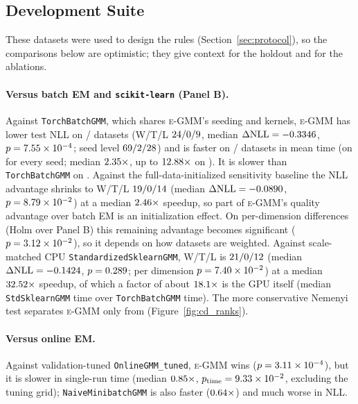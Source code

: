 \documentclass[10pt]{article} %
\newcommand{\egmm}{\textsc{e-GMM}}
\begin{document}
\subsection{Development Suite}
\label{sec:dev}

These datasets were used to design the rules (Section~\ref{sec:protocol}), so the comparisons below are optimistic; they give context for the holdout and for the ablations.

\paragraph{Versus batch EM and \texttt{scikit-learn} (Panel B).} Against \texttt{TorchBatchGMM}, which shares \egmm{}'s seeding and kernels, \egmm{} has lower test NLL on \rATorchBatchGMMW{}/\rnDatasets{} datasets (W/T/L $24/0/9$, median $\Delta\mathrm{NLL} = -0.3346$, $p = 7.55\times 10^{-4}$; seed level $69/2/28$) and is faster on \rATorchBatchGMMFaster{}/\rnDatasets{} datasets in mean time (on \rATorchBatchGMMFasterAll{} for every seed; median $2.35\times$, up to $12.88\times$ on \texttt{\rTopTBNamea}). It is slower than \texttt{TorchBatchGMM} on \rSlowerTBList. Against the full-data-initialized sensitivity baseline the NLL advantage shrinks to W/T/L $19/0/14$ (median $\Delta\mathrm{NLL} = -0.0890$, $p = 8.79\times 10^{-2}$) at a median $2.46\times$ speedup, so part of \egmm{}'s quality advantage over batch EM is an initialization effect. On per-dimension differences (Holm over Panel B) this remaining advantage becomes significant ($p = 3.12\times 10^{-2}$), so it depends on how datasets are weighted. Against scale-matched CPU \texttt{StandardizedSklearnGMM}, W/T/L is $21/0/12$ (median $\Delta\mathrm{NLL} = -0.1424$, $p = 0.289$; per dimension $p = 7.40\times 10^{-2}$) at a median $32.52\times$ speedup, of which a factor of about $18.1\times$ is the GPU itself (median \texttt{StdSklearnGMM} time over \texttt{TorchBatchGMM} time). The more conservative Nemenyi test separates \egmm{} only from \rNemenyiBeyond{} (Figure~\ref{fig:cd_ranks}).

\paragraph{Versus online EM.} Against validation-tuned \texttt{OnlineGMM\_tuned}, \egmm{} wins \rAOnlineGMMtunedWTL{} ($p = 3.11\times 10^{-4}$), but it is slower in single-run time (median $0.85\times$, $p_{\mathrm{time}} = 9.33\times 10^{-2}$, excluding the tuning grid); \texttt{NaiveMinibatchGMM} is also faster ($0.64\times$) and much worse in NLL.
\end{document}
